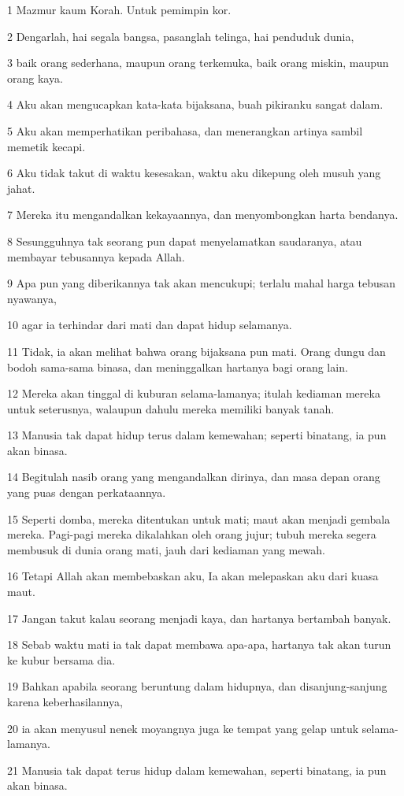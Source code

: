 \par 1 Mazmur kaum Korah. Untuk pemimpin kor.
\par 2 Dengarlah, hai segala bangsa, pasanglah telinga, hai penduduk dunia,
\par 3 baik orang sederhana, maupun orang terkemuka, baik orang miskin, maupun orang kaya.
\par 4 Aku akan mengucapkan kata-kata bijaksana, buah pikiranku sangat dalam.
\par 5 Aku akan memperhatikan peribahasa, dan menerangkan artinya sambil memetik kecapi.
\par 6 Aku tidak takut di waktu kesesakan, waktu aku dikepung oleh musuh yang jahat.
\par 7 Mereka itu mengandalkan kekayaannya, dan menyombongkan harta bendanya.
\par 8 Sesungguhnya tak seorang pun dapat menyelamatkan saudaranya, atau membayar tebusannya kepada Allah.
\par 9 Apa pun yang diberikannya tak akan mencukupi; terlalu mahal harga tebusan nyawanya,
\par 10 agar ia terhindar dari mati dan dapat hidup selamanya.
\par 11 Tidak, ia akan melihat bahwa orang bijaksana pun mati. Orang dungu dan bodoh sama-sama binasa, dan meninggalkan hartanya bagi orang lain.
\par 12 Mereka akan tinggal di kuburan selama-lamanya; itulah kediaman mereka untuk seterusnya, walaupun dahulu mereka memiliki banyak tanah.
\par 13 Manusia tak dapat hidup terus dalam kemewahan; seperti binatang, ia pun akan binasa.
\par 14 Begitulah nasib orang yang mengandalkan dirinya, dan masa depan orang yang puas dengan perkataannya.
\par 15 Seperti domba, mereka ditentukan untuk mati; maut akan menjadi gembala mereka. Pagi-pagi mereka dikalahkan oleh orang jujur; tubuh mereka segera membusuk di dunia orang mati, jauh dari kediaman yang mewah.
\par 16 Tetapi Allah akan membebaskan aku, Ia akan melepaskan aku dari kuasa maut.
\par 17 Jangan takut kalau seorang menjadi kaya, dan hartanya bertambah banyak.
\par 18 Sebab waktu mati ia tak dapat membawa apa-apa, hartanya tak akan turun ke kubur bersama dia.
\par 19 Bahkan apabila seorang beruntung dalam hidupnya, dan disanjung-sanjung karena keberhasilannya,
\par 20 ia akan menyusul nenek moyangnya juga ke tempat yang gelap untuk selama-lamanya.
\par 21 Manusia tak dapat terus hidup dalam kemewahan, seperti binatang, ia pun akan binasa.

